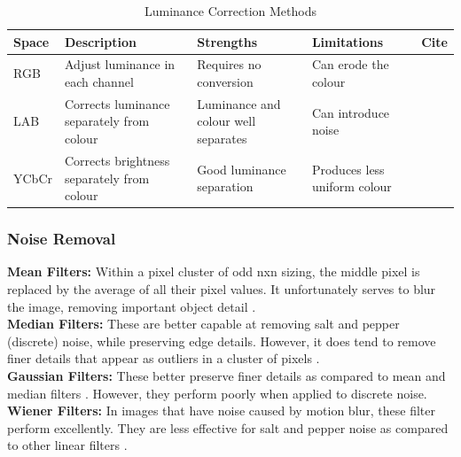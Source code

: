 \begin{table}[H]
    \centering
	\caption{Luminance Correction Methods}\label{tab:lumcor}
    \begin{tabular}{|l|>{\raggedright\arraybackslash}p{4cm}|>{\raggedright\arraybackslash}p{3cm}|>{\raggedright\arraybackslash}p{3cm}|l|}
    \hline
    Space        & Description                                        & Strengths                           & Limitations                                       & Cite                 \\ \hline
    RGB          & Adjust luminance in  each channel           & Requires no conversion   & Can erode the colour                                  & \cite{Yang2022LABNetLC}  \\ \hline
    LAB          & Corrects luminance separately from colour   & Luminance and colour well separates & Can introduce noise                        & \cite{Yang2022LABNetLC}  \\ \hline
    YCbCr        & Corrects brightness separately from colour  & Good luminance separation           & Produces less uniform colour               & \cite{Wang2017StackedCG} \\ \hline
    \end{tabular}
\end{table}

\subsubsection{Noise Removal}

\textbf{Mean Filters:} Within a pixel cluster of odd nxn sizing, the middle pixel is replaced by the average of all their pixel values. It unfortunately serves to blur the image, removing important object detail \cite{Chauhan2018PerformanceAO}.\\
\textbf{Median Filters:} These are better capable at removing salt and pepper (discrete) noise, while preserving edge details. However, it does tend to remove finer details that appear as outliers in a cluster of pixels \cite{Chauhan2018PerformanceAO}.\\
\textbf{Gaussian Filters:} These better preserve finer details as compared to mean and median filters \cite{Chauhan2018PerformanceAO}. However, they perform poorly when applied to discrete noise.\\
\textbf{Wiener Filters:} In images that have noise caused by motion blur, these filter perform excellently. They are less effective for salt and pepper noise as compared to other linear filters \cite{Chauhan2018PerformanceAO}.

